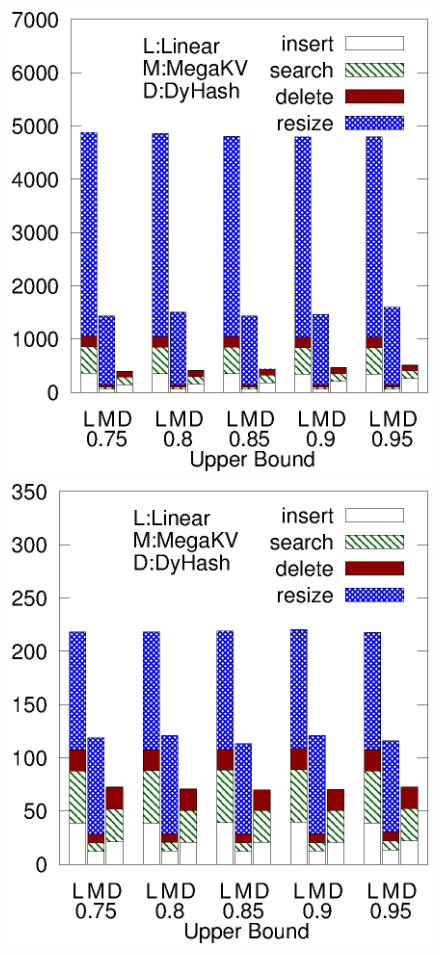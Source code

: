 \begin{figure}[htp]
\begin{minipage}{0.19\linewidth}
		\centerline{\dsreddit}
	\end{minipage}
	\begin{minipage}{0.19\linewidth}\centering
		\includegraphics[width=\linewidth]{pic/dynamic/tpch/diff_upper.eps}
		\centerline{\dstpch}
	\end{minipage}
	\begin{minipage}{0.19\linewidth}\centering
		\includegraphics[width=\linewidth]{pic/dynamic/ali/diff_upper.eps}

\end{minipage}
\end{figure}
